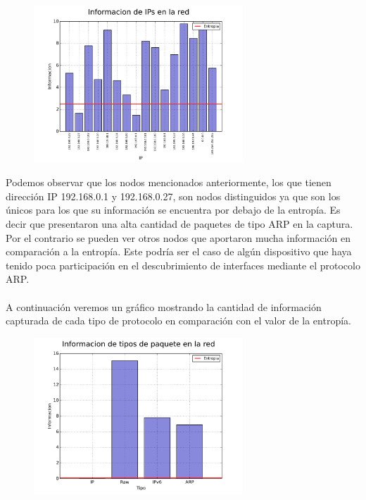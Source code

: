 \FloatBarrier

\begin{figure}[ht!]
  \centering
   \includegraphics[width=0.7\textwidth]{graficos/domestica_network_information_bars_arp.png}
  \caption{}
  \label{fig:domestica_network_information_bars_arp}
\end{figure}

\FloatBarrier

Podemos observar que los nodos mencionados anteriormente, los que tienen dirección IP 192.168.0.1 y 192.168.0.27, son nodos distinguidos ya que son los únicos para los que su información se encuentra por debajo de la entropía. Es decir que presentaron una alta cantidad de paquetes de tipo ARP en la captura. Por el contrario se pueden ver otros nodos que aportaron mucha información en comparación a la entropía. Este podría ser el caso de algún dispositivo que haya tenido poca participación en el descubrimiento de interfaces mediante el protocolo ARP.
\\\\
A continuación veremos un gráfico mostrando la cantidad de información capturada de cada tipo de protocolo en comparación con el valor de la entropía.

\FloatBarrier

\begin{figure}[ht!]
  \centering
   \includegraphics[width=0.7\textwidth]{graficos/domestica_network_information_bars_type.png}
  \caption{}
  \label{fig:domestica_network_information_bars_type}
\end{figure}

